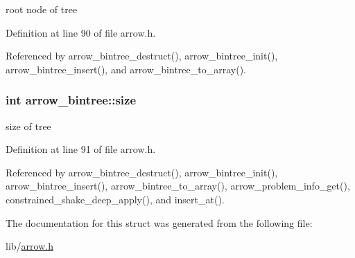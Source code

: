 root node of tree 

Definition at line 90 of file arrow.h.

Referenced by arrow\_\-bintree\_\-destruct(), arrow\_\-bintree\_\-init(), arrow\_\-bintree\_\-insert(), and arrow\_\-bintree\_\-to\_\-array().\hypertarget{structarrow__bintree_7570628df0b5317cc8e240499ba12974}{
\subsubsection{\setlength{\rightskip}{0pt plus 5cm}int {\bf arrow\_\-bintree::size}}}
\label{structarrow__bintree_7570628df0b5317cc8e240499ba12974}


size of tree 

Definition at line 91 of file arrow.h.

Referenced by arrow\_\-bintree\_\-destruct(), arrow\_\-bintree\_\-init(), arrow\_\-bintree\_\-insert(), arrow\_\-bintree\_\-to\_\-array(), arrow\_\-problem\_\-info\_\-get(), constrained\_\-shake\_\-deep\_\-apply(), and insert\_\-at().

The documentation for this struct was generated from the following file:\begin{CompactItemize}
\item 
lib/\hyperlink{arrow_8h}{arrow.h}\end{CompactItemize}
